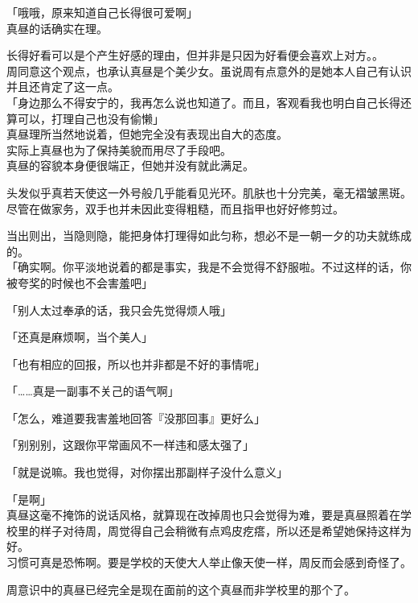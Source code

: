 「哦哦，原来知道自己长得很可爱啊」\\

真昼的话确实在理。

长得好看可以是个产生好感的理由，但并非是只因为好看便会喜欢上对方。。\\

周同意这个观点，也承认真昼是个美少女。虽说周有点意外的是她本人自己有认识并且还肯定了这一点。\\

「身边那么不得安宁的，我再怎么说也知道了。而且，客观看我也明白自己长得还算可以，打理自己也没有偷懒」\\

真昼理所当然地说着，但她完全没有表现出自大的态度。\\

实际上真昼也为了保持美貌而用尽了手段吧。\\

真昼的容貌本身便很端正，但她并没有就此满足。

头发似乎真若天使这一外号般几乎能看见光环。肌肤也十分完美，毫无褶皱黑斑。尽管在做家务，双手也并未因此变得粗糙，而且指甲也好好修剪过。

当出则出，当隐则隐，能把身体打理得如此匀称，想必不是一朝一夕的功夫就练成的。\\

「确实啊。你平淡地说着的都是事实，我是不会觉得不舒服啦。不过这样的话，你被夸奖的时候也不会害羞吧」

「别人太过奉承的话，我只会先觉得烦人哦」

「还真是麻烦啊，当个美人」

「也有相应的回报，所以也并非都是不好的事情呢」

「……真是一副事不关己的语气啊」

「怎么，难道要我害羞地回答『没那回事』更好么」

「别别别，这跟你平常画风不一样违和感太强了」

「就是说嘛。我也觉得，对你摆出那副样子没什么意义」

「是啊」\\

真昼这毫不掩饰的说话风格，就算现在改掉周也只会觉得为难，要是真昼照着在学校里的样子对待周，周觉得自己会稍微有点鸡皮疙瘩，所以还是希望她保持这样为好。\\

习惯可真是恐怖啊。要是学校的天使大人举止像天使一样，周反而会感到奇怪了。

周意识中的真昼已经完全是现在面前的这个真昼而非学校里的那个了。\\

